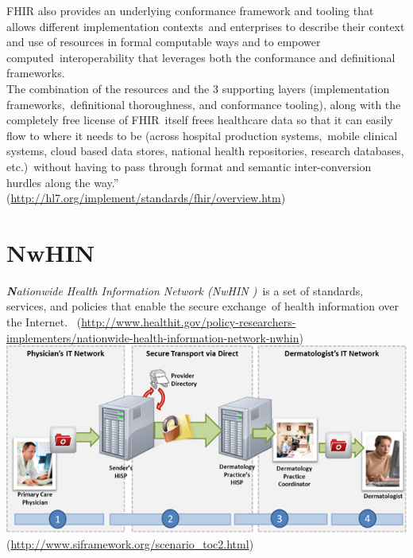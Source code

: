 \documentclass[DIV=calc, paper=a4, fontsize=12pt, onecolumn]{scrartcl}	 %
\newcommand{\initial}[1]{ %
\lettrine[lines=3,lhang=0.3,nindent=0em,slope=0em]{
\color{DarkBlue}
{\textbf{\textit{#1}}}}{}}
\begin{document}
FHIR also provides an underlying conformance framework and tooling that allows different implementation contexts\ 
and enterprises to describe their context and use of resources in formal computable ways and to empower computed\
 interoperability that leverages both the conformance and definitional frameworks.\\

The combination of the resources and the 3 supporting layers (implementation frameworks,\
definitional thoroughness, and conformance tooling), along with the completely free license of FHIR\
 itself frees healthcare data so that it can easily flow to where it needs to be (across hospital production systems,\
 mobile clinical systems, cloud based data stores, national health repositories, research databases, etc.)\
without having to pass through format and semantic inter-conversion hurdles along the way.”\\
 (\url{http://hl7.org/implement/standards/fhir/overview.htm})



\section[Nationwide Health Information Network (NwHIN)]{NwHIN}
  \label{sec:nwhin}

\initial{N}\textit{ationwide Health Information Network (NwHIN )}\
is a set of standards, services, and policies that enable the secure exchange\
of health information over the Internet. \
(\url{http://www.healthit.gov/policy-researchers-implementers/nationwide-health-information-network-nwhin})\\

\includegraphics[scale=0.5]{nwhin.png}\\
(\url{http://www.siframework.org/scenario_toc2.html})\
\end{document}

